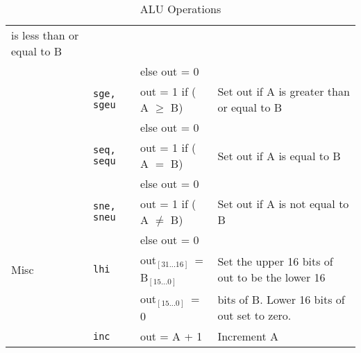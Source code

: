 \documentclass[a4paper,10pt]{article}
\begin{document}
\begin{table}[h]
\begin{center}
\begin{tabular}{|l|l|l|p{75mm}|}
is less than or equal to B\\
& & else out = 0 & \\
\cline{2-4}
& \texttt{sge, sgeu} & out = 1 if ( A $\ge$ B) & Set out if A
is greater than or equal to B\\
& & else out = 0 & \\
\cline{2-4}
& \texttt{seq, sequ} & out = 1 if ( A $=$ B) & Set out if A
is equal to B \\
& & else out = 0 & \\
\cline{2-4}
& \texttt{sne, sneu} & out = 1 if ( A $\neq$ B) & Set out if A
is not equal to B \\
& & else out = 0 & \\
\hline
Misc & \texttt{lhi} & out\tiny$_{[31...16]}$\normalsize~= B\tiny$_{[15...0]}$ &
Set the upper 16 bits of out to be the lower 16 \\
& & out\tiny$_{[15...0]}$\normalsize~= 0 & bits of B. Lower 16 bits of out set to zero. \\ 
\cline{2-4}
& \texttt{inc} & out = A + 1 & Increment A\\
\hline
\end{tabular}
\end{center}
\caption{ALU Operations}
\label{table:alu}
\end{table}
\end{document}
